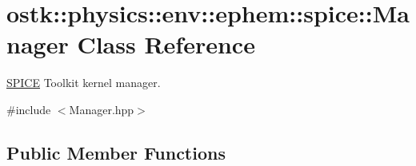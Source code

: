 \hypertarget{classostk_1_1physics_1_1env_1_1ephem_1_1spice_1_1_manager}{}\section{ostk\+:\+:physics\+:\+:env\+:\+:ephem\+:\+:spice\+:\+:Manager Class Reference}
\label{classostk_1_1physics_1_1env_1_1ephem_1_1spice_1_1_manager}


\hyperlink{classostk_1_1physics_1_1env_1_1ephem_1_1_s_p_i_c_e}{S\+P\+I\+CE} Toolkit kernel manager.  




{\ttfamily \#include $<$Manager.\+hpp$>$}

\subsection*{Public Member Functions}
